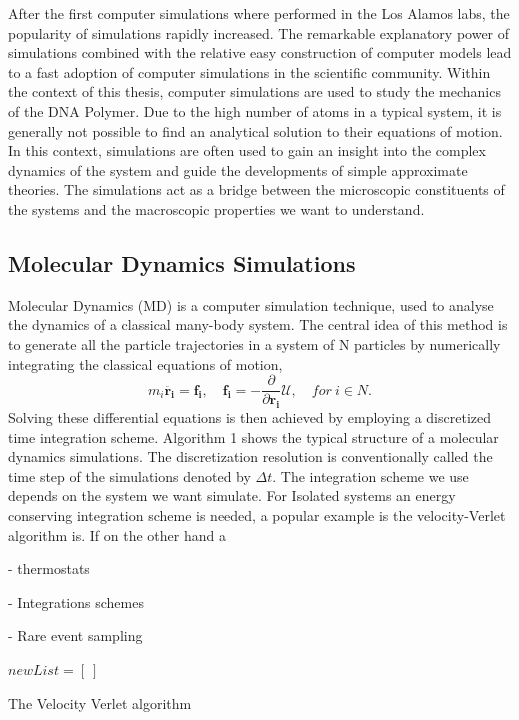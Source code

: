 After the first computer simulations where performed in the Los Alamos labs, the
popularity of simulations rapidly increased. The remarkable explanatory power of
simulations combined with the relative easy construction of computer models lead to a
fast adoption of computer simulations in the scientific community. Within the context of
this thesis, computer simulations are used to study the mechanics of
the DNA Polymer. Due to the high number of atoms in a typical system, it is generally
not possible to find an analytical solution to their equations of motion. In this
context, simulations are often used to gain an insight into the complex dynamics of the
system and guide the developments of simple approximate theories. The simulations
act as a bridge between the microscopic constituents of the systems and the macroscopic
properties we want to understand.


\subsection{Molecular Dynamics Simulations}
Molecular Dynamics (MD) is a computer simulation technique, used to analyse
the dynamics of a classical many-body system. The central idea of this method is to
generate all the particle trajectories in a system of N particles by numerically
integrating the classical equations of motion,
\[
    m_i \boldsymbol{\ddot{r_i}} = \boldsymbol{f_i}, \quad \boldsymbol{f_i} = -
    \frac{\partial}{\partial \boldsymbol{r_i}} \mathcal{U}, \quad for\ i \in N.
\]
Solving these differential equations is then achieved by employing a discretized time
integration scheme.  Algorithm 1 shows the typical structure of a molecular dynamics
simulations. The discretization resolution is conventionally called the time step of the
simulations denoted by $\Delta t$. The integration scheme we use depends on the system we
want simulate. For Isolated systems an energy conserving integration scheme is needed, a
popular example is the velocity-Verlet algorithm is. If on the other hand a

- thermostats

- Integrations schemes

- Rare event sampling

\begin{algorithm}


    $newList = [\ ]$


    \caption{The Velocity Verlet algorithm}
\end{algorithm}

